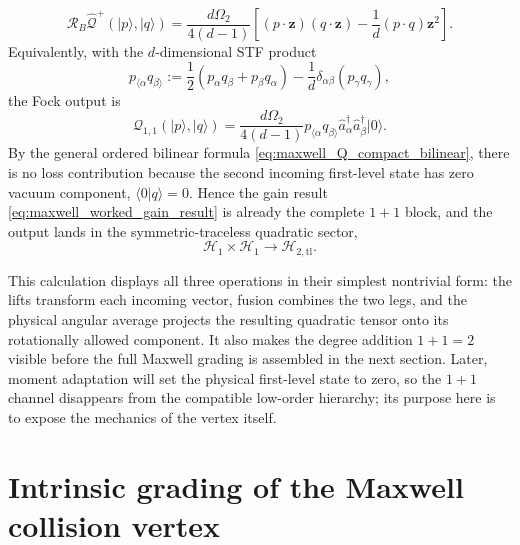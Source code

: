 \documentclass[11pt,oneside]{article}
\numberwithin{equation}{section}
\theoremstyle{definition}
\begin{document}
\begin{equation}
\mathcal R_B\widehat{\mathcal Q}^{+}(|p\rangle,|q\rangle)
=
\frac{d\Omega_2}{4(d-1)}
\left[
(p\cdot\bm z)(q\cdot\bm z)
-
\frac1d(p\cdot q)\bm z^2
\right].
\label{eq:maxwell_worked_gain_result}
\end{equation}
Equivalently, with the $d$-dimensional STF product
\begin{equation}
p_{\langle\alpha}q_{\beta\rangle}
:=
\frac12(p_\alpha q_\beta+p_\beta q_\alpha)
-\frac1d\delta_{\alpha\beta}(p_\gamma q_\gamma),
\end{equation}
the Fock output is
\begin{equation}
\widehat{\mathcal Q}_{1,1}(|p\rangle,|q\rangle)
=
\frac{d\Omega_2}{4(d-1)}
p_{\langle\alpha}q_{\beta\rangle}
\hat a_\alpha^\dagger\hat a_\beta^\dagger|0\rangle .
\label{eq:maxwell_worked_11_to_2}
\end{equation}
By the general ordered bilinear formula
\eqref{eq:maxwell_Q_compact_bilinear}, there is no loss contribution because
the second incoming first-level state has zero vacuum component,
$\langle0|q\rangle=0$.  Hence the gain result
\eqref{eq:maxwell_worked_gain_result} is already the complete $1+1$ block,
and the output lands in the symmetric-traceless quadratic sector,
\begin{equation}
\mathscr H_1\times\mathscr H_1
\longrightarrow
\mathscr H_{2,\mathrm{tl}}.
\end{equation}

This calculation displays all three operations in their simplest nontrivial form: the lifts transform each incoming vector, fusion combines the two legs, and the physical angular average projects the resulting quadratic tensor onto its rotationally allowed component.  It also makes the degree addition $1+1=2$ visible before the full Maxwell grading is assembled in the next section.  Later, moment adaptation will set the physical first-level state to zero, so the $1+1$ channel disappears from the compatible low-order hierarchy; its purpose here is to expose the mechanics of the vertex itself.


\section{Intrinsic grading of the Maxwell collision vertex}
\label{subsec:maxwell_grading}
\end{document}
